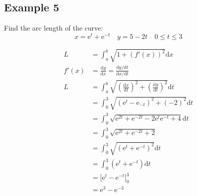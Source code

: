 \documentclass[letterpaper, 12pt]{article}
\newcommand*{\diff}{\mathrm{d}}
\newcommand*{\e}{\mathrm{e}}
\begin{document}
\subsection*{Example 5}
Find the arc length of the curve:
\[ x = \e^{t}+\e^{-t} \quad y = 5-2t \quad 0 \leq t \leq 3 \]
\begin{center}
\end{center}
\begin{align*}
  L &= \int_{a}^{b}{\sqrt{1+(f'(x))^{2}}\diff{x}} \\
  f'(x) &= \frac{\diff{y}}{\diff{x}} =
    \frac{\diff{y}/\diff{t}}{\diff{x}/\diff{t}} \\
  L &= \int_{a}^{b}{\sqrt{(\frac{\diff{x}}{\diff{t}})^{2}+
      (\frac{\diff{y}}{\diff{t}})^{2}}\diff{t}} \\
  &= \int_{0}^{3}{\sqrt{(\e^{t}-\e_{-t})^{2}+(-2)^{2}}\diff{t}} \\
  &= \int_{0}^{3}{\sqrt{\e^{2t}+\e^{-2t}-2\e^{t}\e^{-t}+4}\diff{t}} \\
  &= \int_{0}^{3}{\sqrt{\e^{2t}+\e^{-2t}+2}} \\
  &= \int_{0}^{3}{\sqrt{(\e^{t}+\e^{-t})^{2}}\diff{t}} \\
  &= \int_{0}^{3}{(\e^{t}+\e^{-t})\diff{t}} \\
  &= \bigg[\e^{t}-\e^{-t}\bigg]_{0}^{3} \\
  &= \e^{3}-\e^{-3}
\end{align*}
\end{document}
